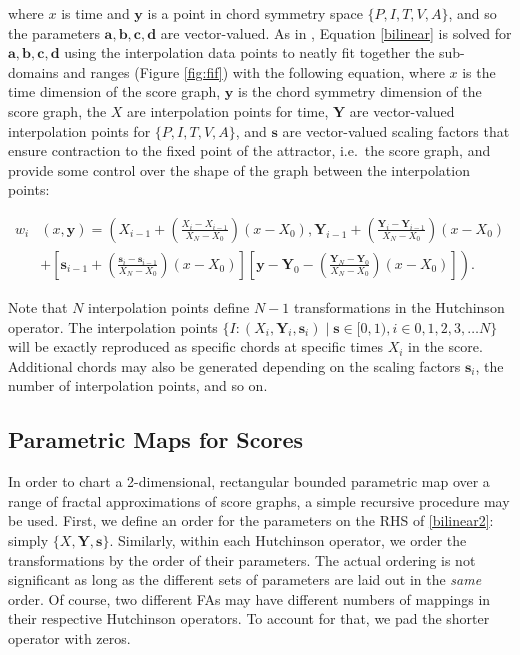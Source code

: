 \documentclass[english,11pt,letterpaper,onecolumn]{scrartcl}
\numberwithin{equation}{section}
\begin{document}
\noindent where $x$ is time and $\mathbf{y}$ is a point in chord symmetry space $\{P,
I, T, V, A\}$, and so the parameters $\mathbf{a, b, c, d}$ are vector-valued.
As in \cite{2012arXiv1209.3139B}, Equation \eqref{bilinear} is solved for
$\mathbf{a, b, c, d}$ using the interpolation data points to neatly fit together
the sub-domains and ranges (Figure \ref{fig:fif}) with the following
equation, where $x$ is the time dimension of the score graph, $\mathbf{y}$ is
the chord symmetry dimension of the score graph, the $X$ are interpolation
points for time, $\mathbf{Y}$ are vector-valued interpolation points for $\{P,
I, T, V, A\}$, and $\mathbf{s}$ are vector-valued scaling factors that ensure
contraction to the fixed point of the attractor, i.e.\ the score graph, and
provide some control over the shape of the graph between the interpolation
points:

\begin{align}
w_{i} &  (x,\mathbf{y})= \left(X_{i-1}+ \left(  \frac{X_{i}-X_{i-1}}{X_{N}-X_{0}}\right)
(x-X_{0}),\mathbf{Y}_{i-1}+\left(  \frac{\mathbf{Y}_{i}-\mathbf{Y}_{i-1}}{X_{N}-X_{0}%
}\right)  (x-X_{0})\right.\label{bilinear2}\\
& \left. + \left[  \mathbf{s}_{i-1}+\left(  \frac{\mathbf{s}_{i}-\mathbf{s}_{i-1}}{X_{N}-X_{0}}\right)
(x-X_{0})\right]  \left[  \mathbf{y}-\mathbf{Y}_{0}-\left(  \frac{\mathbf{Y}_{N}-\mathbf{Y}_{0}}{X_{N}-X_{0}%
}\right)  (x-X_{0})\right]\right)  .\nonumber
\end{align}

Note that $N$ interpolation points define $N-1$ transformations in the
Hutchinson operator. The interpolation points $\{I : (X_i, \mathbf{Y}_i,
\mathbf{s}_i) \mid \mathbf{s} \in [0, 1), i \in 0, 1, 2, 3, \dots N\}$ will be
exactly reproduced as specific chords at specific times $X_i$ in the score.
Additional chords may also be generated depending on the scaling factors
$\mathbf{s}_i$, the number of interpolation points, and so on.

\subsection{Parametric Maps for Scores}

In order to chart a 2-dimensional, rectangular bounded parametric map over a
range of fractal approximations of score graphs, a simple recursive procedure
may be used. First, we define an order for the parameters on the RHS of
\eqref{bilinear2}: simply $\{X, \mathbf{Y}, \mathbf{s}\}$. Similarly, within
each Hutchinson operator, we order the transformations by the order of their
parameters. The actual ordering is not significant as long as the different sets
of parameters are laid out in the \textit{same} order. Of course, two different
FAs may have different numbers of mappings in their respective Hutchinson
operators. To account for that, we pad the shorter operator with zeros.
\end{document}
